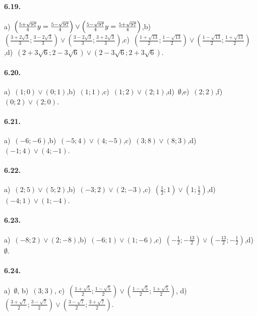 \paragraph{6.19.} a)~$\left(\frac{5+\sqrt{97}} 4\\y=\frac{5-\sqrt{97}} 4\right)\vee \left(\frac{5-\sqrt{97}} 4\\y=\frac{5+\sqrt{97}} 4\right)$,\quad b)~$\left(\frac{3+{2\sqrt 3}} 3;\frac {3-{2\sqrt 3}} 3\right)\vee \left(\frac {3-{2\sqrt 3}} 3;\frac{3+{2\sqrt 3}} 3\right)$,\quad c)~$\left(\frac{1+\sqrt{13}} 2;\frac{1-\sqrt{13}} 2\right)\vee \left(\frac{1-\sqrt{13}} 2;\frac{1+\sqrt{13}} 2\right)$,\quad d)~$\left(2+3\sqrt 6;2-3\sqrt 6\right)\vee \left(2-3\sqrt 6;2+3\sqrt 6\right)$.

\paragraph{6.20.} a)~$(1;0)\vee(0;1)$,\quad b)~$(1;1)$,\quad c)~$(1;2)\vee(2;1)$,\quad d)~$\emptyset$,\quad e)~$(2;2)$,\quad f)~$(0;2)\vee(2;0)$.

\paragraph{6.21.} a)~$(-6;-6)$,\quad b)~$(-5;4)\vee(4;-5)$,\quad c)~$(3;8)\vee(8;3)$,\quad d)~$(-1;4)\vee(4;-1)$.

\paragraph{6.22.} a)~$(2;5)\vee(5;2)$,\quad b)~$(-3;2)\vee(2;-3)$,\quad c)~$(\frac 1 2;1)\vee(1;\frac 1 2)$,\quad d)~$(-4;1)\vee(1;-4)$.

\paragraph{6.23.} a)~$(-8;2)\vee(2;-8)$,\quad b)~$(-6;1)\vee(1;-6)$,\quad c)~$\left(-\frac 1 2;-\frac{13} 2\right)\vee \left(-\frac{13} 2;-\frac 1 2\right)$,\quad d)~$\emptyset $.

\paragraph{6.24.} a)~$\emptyset $,\; b)~$(3;3)$,\; c)~$\left(\frac{1+\sqrt 5} 2;\frac{1-\sqrt 5} 2\right)\vee \left(\frac{1-\sqrt 5} 2;\frac{1+\sqrt 5} 2\right)$,\; d)~$\left(\frac{3+\sqrt 7} 2;\frac{3-\sqrt 7} 2\right)\vee \left(\frac{3-\sqrt 7} 2;\frac{3+\sqrt 7} 2\right)$.

